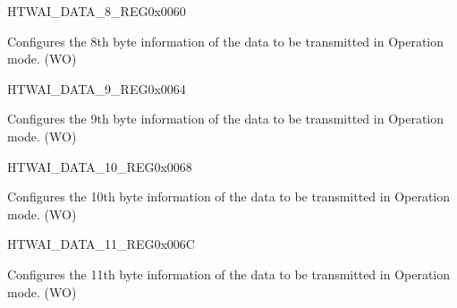 \begin{register}{H}{TWAI\_DATA\_8\_REG}{0x0060}\label{regdesc:TWAIDATA8REG}
%
%
\regnewline%
\begin{regdesc}\begin{reglist}
\label{fielddesc:TWAITXBYTE8}\item [TWAI\_TX\_BYTE\_8] Configures the 8th byte information of the data to be transmitted in Operation mode. (WO)
\end{reglist}\end{regdesc}
\end{register}


\begin{register}{H}{TWAI\_DATA\_9\_REG}{0x0064}\label{regdesc:TWAIDATA9REG}
%
%
\regnewline%
\begin{regdesc}\begin{reglist}
\label{fielddesc:TWAITXBYTE9}\item [TWAI\_TX\_BYTE\_9] Configures the 9th byte information of the data to be transmitted in Operation mode. (WO)
\end{reglist}\end{regdesc}
\end{register}


\begin{register}{H}{TWAI\_DATA\_10\_REG}{0x0068}\label{regdesc:TWAIDATA10REG}
%
%
\regnewline%
\begin{regdesc}\begin{reglist}
\label{fielddesc:TWAITXBYTE10}\item [TWAI\_TX\_BYTE\_10] Configures the 10th byte information of the data to be transmitted in Operation mode. (WO)
\end{reglist}\end{regdesc}
\end{register}


\begin{register}{H}{TWAI\_DATA\_11\_REG}{0x006C}\label{regdesc:TWAIDATA11REG}
%
%
\regnewline%
\begin{regdesc}\begin{reglist}
\label{fielddesc:TWAITXBYTE11}\item [TWAI\_TX\_BYTE\_11] Configures the 11th byte information of the data to be transmitted in Operation mode. (WO)
\end{reglist}\end{regdesc}
\end{register}



